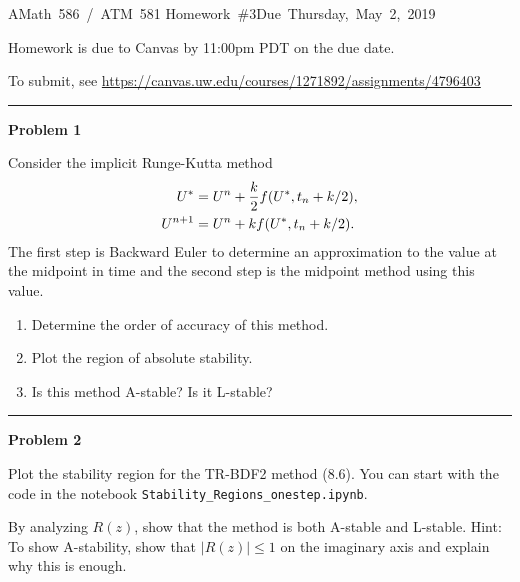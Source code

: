 \documentclass[10pt]{article}
\begin{document}
\hfill\vbox{\hbox{AMath 586 / ATM 581}
\hbox{Homework \#3}\hbox{Due Thursday, May 2, 2019}}

\vskip 5pt

Homework is due to Canvas by 11:00pm PDT on the due date.

To submit, see
\url{https://canvas.uw.edu/courses/1271892/assignments/4796403}



\vskip 1cm
\hrule
{\bf Problem 1}

Consider the implicit Runge-Kutta method
\begin{equation}\label{ex1}
\begin{split}
U^* &= U^n + \frac{k}{2} f\large(U^*, t_n + k/2\large),\\
U^{n+1} &= U^n + k f\large(U^*, t_n + k/2\large).
\end{split}
\end{equation} 
The first step is Backward Euler to determine an approximation to the value
at the midpoint in time and the second step is the midpoint method using
this value.

\begin{enumerate}
\item Determine the order of accuracy of this method.
\item Plot the region of absolute stability.
\item Is this method A-stable?  Is it L-stable?
\end{enumerate}




\vskip 1cm
\hrule
{\bf Problem 2}


Plot the stability region for the TR-BDF2 method (8.6).   
You can start with the code in the
notebook {\tt Stability\_Regions\_onestep.ipynb}.

By analyzing $R(z)$, show 
that the method is both A-stable and L-stable.
Hint: To show A-stability, show that $|R(z)| \leq 1$ on the imaginary axis
and explain why this is enough.


\end{document}
